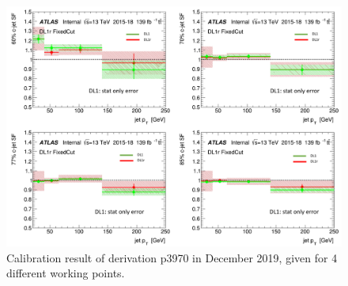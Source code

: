 \documentclass[letterpaper,12pt]{article}
\begin{document}
\begin{figure}
\includegraphics[width=1\textwidth]{Dec.png}
\caption{Calibration result of derivation p3970 in December 2019, given for  4 different working points.}\label{fig:Dec}
\end{figure}
\end{document}
